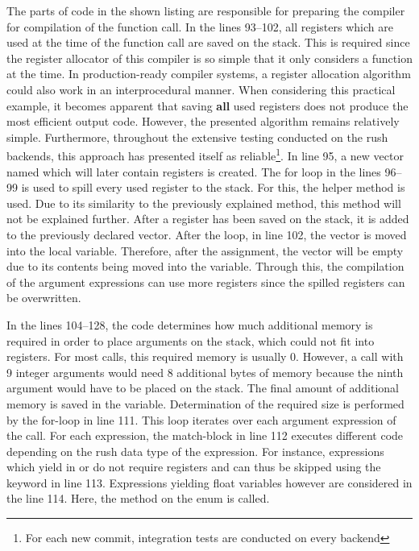 The parts of code in the shown listing are responsible for preparing the compiler for compilation of the function call.
In the lines 93--102, all registers which are used at the time of the function call are saved on the stack.
This is required since the register allocator of this compiler is so simple that it only considers a function at the time.
In production-ready compiler systems, a register allocation algorithm could also work in an interprocedural manner.
When considering this practical example, it becomes apparent that saving \textbf{all} used registers does not produce the most efficient output code.
However, the presented algorithm remains relatively simple.
Furthermore, throughout the extensive testing conducted on the rush backends, this approach has presented itself as reliable\footnote{For each new commit, \rushCountTests integration tests are conducted on every backend}.
In line 95, a new vector named  which will later contain registers is created.
The for loop in the lines 96--99 is used to spill every used register to the stack.
For this, the helper method  is used.
Due to its similarity to the previously explained  method, this method will not be explained further.
After a register has been saved on the stack, it is added to the previously declared vector.
After the loop, in line 102, the  vector is moved into the local  variable.
Therefore, after the assignment, the  vector will be empty due to its contents being moved into the  variable.
Through this, the compilation of the argument expressions can use more registers since the spilled registers can be overwritten.

In the lines 104--128, the code determines how much additional memory is required in order to place arguments on the stack, which could not fit into registers.
For most calls, this required memory is usually 0.
However, a call with 9 integer arguments would need 8 additional bytes of memory because the ninth argument would have to be placed on the stack.
The final amount of additional memory is saved in the  variable.
Determination of the required size is performed by the for-loop in line 111.
This loop iterates over each argument expression of the call.
For each expression, the match-block in line 112 executes different code depending on the rush data type of the expression.
For instance, expressions which yield in \qVerb{()} or \qVerb{!} do not require registers and can thus be skipped using the  keyword in line 113.
Expressions yielding float variables however are considered in the line 114.
Here, the  method on the  enum is called.

